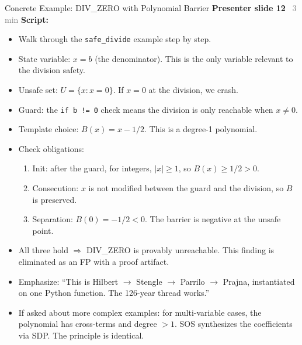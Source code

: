 \documentclass[aspectratio=169]{beamer}
\newcommand{\syncline}[2]{\textbf{#1} \hfill \textcolor{gray}{#2}}
\begin{document}
\begin{frame}[fragile]{Concrete Example: DIV\_ZERO with Polynomial Barrier}
\syncline{Presenter slide 12}{~3 min}
\textbf{Script:}
\begin{itemize}
  \item Walk through the \texttt{safe\_divide} example step by step.
  \item State variable: $x = b$ (the denominator). This is the only variable relevant to the division safety.
  \item Unsafe set: $U = \{x : x = 0\}$. If $x = 0$ at the division, we crash.
  \item Guard: the \texttt{if b != 0} check means the division is only reachable when $x \neq 0$.
  \item Template choice: $B(x) = x - 1/2$. This is a degree-1 polynomial.
  \item Check obligations:
  \begin{enumerate}
    \item Init: after the guard, for integers, $|x| \ge 1$, so $B(x) \ge 1/2 > 0$. \checkmark
    \item Consecution: $x$ is not modified between the guard and the division, so $B$ is preserved. \checkmark
    \item Separation: $B(0) = -1/2 < 0$. The barrier is negative at the unsafe point. \checkmark
  \end{enumerate}
  \item All three hold $\Rightarrow$ DIV\_ZERO is provably unreachable. This finding is eliminated as an FP with a proof artifact.
  \item Emphasize: ``This is Hilbert $\to$ Stengle $\to$ Parrilo $\to$ Prajna, instantiated on one Python function. The 126-year thread works.''
  \item If asked about more complex examples: for multi-variable cases, the polynomial has cross-terms and degree $> 1$. SOS synthesizes the coefficients via SDP. The principle is identical.
\end{itemize}
\end{frame}

\end{document}
